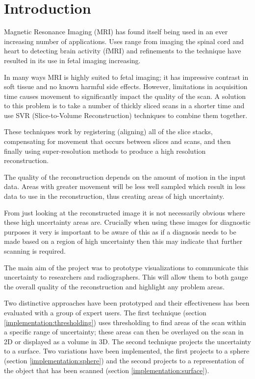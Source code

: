 \chapter{Introduction}\label{chapter:introduction}

Magnetic Resonance Imaging (MRI) has found itself being used in an ever increasing number of applications. Uses range from imaging the spinal cord and heart to detecting brain activity (fMRI) and refinements to the technique have resulted in its use in fetal imaging increasing.

In many ways MRI is highly suited to fetal imaging; it has impressive contrast in soft tissue and no known harmful side effects. However, limitations in acquisition time causes movement to significantly impact the quality of the scan. A solution to this problem is to take a number of thickly sliced scans in a shorter time and use SVR (Slice-to-Volume Reconstruction) techniques to combine them together.

These techniques work by registering (aligning) all of the slice stacks, compensating for movement that occurs between slices and scans, and then finally using super-resolution methods to produce a high resolution reconstruction.

The quality of the reconstruction depends on the amount of motion in the input data. Areas with greater movement will be less well sampled which result in less data to use in the reconstruction, thus creating areas of high uncertainty.

From just looking at the reconstructed image it is not necessarily obvious where these high uncertainty areas are. Crucially when using these images for diagnostic purposes it very is important to be aware of this as if a diagnosis needs to be made based on a region of high uncertainty then this may indicate that further scanning is required.

The main aim of the project was to prototype visualizations to communicate this uncertainty to researchers and radiographers. This will allow them to both gauge the overall quality of the reconstruction and highlight any problem areas.

Two distinctive approaches have been prototyped and their effectiveness has been evaluated with a group of expert users. The first technique (section \ref{implementation:thresholding}) uses thresholding to find areas of the scan within a specific range of uncertainty; these areas can then be overlayed on the scan in 2D or displayed as a volume in 3D. The second technique projects the uncertainty to a surface. Two variations have been implemented, the first projects to a sphere (section \ref{implementation:sphere}) and the second projects to a representation of the object that has been scanned (section \ref{implementation:surface}).

